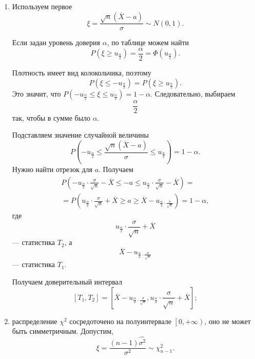 \begin{enumerate}[label=\alph*)]
  \item Используем первое
  $$ \xi =
    \frac{ \sqrt{n} \left( \overline{X} - a \right) }{ \sigma } \sim
    N \left( 0, 1 \right).$$

  Если задан уровень доверия $ \alpha $, по таблице можем найти
  $$P \left( \xi \geq u_{ \frac{ \alpha }{2}} \right) =
    \frac{ \alpha }{2} =
    \Phi \left( u_{ \frac{ \alpha }{2}} \right).$$

  Плотность имеет вид колокольчика,
  поэтому
  $$P \left( \xi \leq - u_{ \frac{ \alpha }{2}} \right) =
    P \left( \xi \geq u_{ \frac{ \alpha }{2}} \right).$$
  Это значит,
  что
  $P \left( -u_{ \frac{ \alpha }{2}} \leq \xi \leq u_{ \frac{ \alpha }{2}} \right) =
    1 - \alpha $.
  Следовательно, выбираем
  $$ \frac{ \alpha }{2}$$
  так, чтобы в сумме было $ \alpha $.

  Подставляем значение случайной величины
  $$P \left(
      -u_{ \frac{ \alpha }{2}} \leq \frac{ \sqrt{n} \left( \overline{X} - a \right) }{ \sigma } \leq
      u_{ \frac{ \alpha }{2}}
    \right) =
    1 - \alpha.$$
  Нужно найти отрезок для $a$.
  Получаем
  \begin{equation*}
    \begin{split}
      P \left(
        -u_{ \frac{ \alpha }{2}} \cdot \frac{ \sigma }{ \sqrt{n}} - \overline{X} \leq -a \leq
        u_{ \frac{ \alpha }{2}} \cdot \frac{ \sigma }{ \sqrt{n}} - \overline{X}
      \right) = \\
      = P \left(
        u_{ \frac{ \alpha }{2}} \cdot \frac { \sigma }{ \sqrt{n}} + \overline{X} \geq a \geq
        \overline{X} - u_{ \frac{ \alpha }{2} \cdot \frac{ \sigma }{ \sqrt{n}}}
      \right) =
      1 - \alpha,
    \end{split}
  \end{equation*}
  где
  $$u_{ \frac{ \alpha }{2}} \cdot \frac { \sigma }{ \sqrt{n}} + \overline{X}$$
  --- статистика $T_2$, а
  $$ \overline{X} - u_{ \frac{ \alpha }{2} \cdot \frac{ \sigma }{ \sqrt{n}}}$$
  --- статистика $T_1$.

  Получаем доверительный интервал
  $$ \left[ T_1, T_2 \right] =
    \left[
      \overline{X} - u_{ \frac{ \alpha }{2} \cdot \frac{ \sigma }{ \sqrt{n}}},
      u_{ \frac{ \alpha }{2}} \cdot \frac { \sigma }{ \sqrt{n}} + \overline{X}
    \right];$$
  \item распределение $ \chi^2$ сосредоточено на полуинтервале $ \left[ 0, + \infty \right) $,
  оно не может быть симметричным.
  Допустим,
  $$ \xi =
    \frac{ \left( n - 1 \right) \hat{ \sigma^2}}{ \sigma^2} \sim
    \chi_{n - 1}^2.$$


\end{enumerate}
